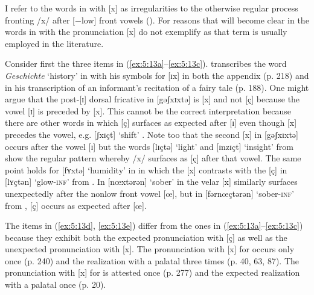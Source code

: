 I refer to the words in  with [x] as irregularities to the otherwise regular process fronting /x/ after [−low] front vowels (). For reasons that will become clear in  the words in  with the pronunciation [x] do not exemplify  as that term is usually employed in the literature.

Consider first the three items in (\ref{ex:5:13a}--\ref{ex:5:13c}). \citet[218]{Martin1925} transcribes the word \textit{Geschichte} ‘history’ in  with his symbols for [ɪx] in both the appendix (p. 218) and in his transcription of an informant’s recitation of a fairy tale (p. 188). One might argue that the post-[ɪ] dorsal fricative in [gəʃxɪxtə] is [x] and not [ç] because the vowel [ɪ] is preceded by [x]. This cannot be the correct interpretation because there are other words in which [ç] surfaces as expected after [ɪ] even though [x] precedes the vowel, e.g. [ʃxɪçt] ‘shift’ \citep[262]{Martin1925}. Note too that the second [x] in [gəʃxɪxtə] occurs after the vowel [ɪ] but the words [lɪçtə] ‘light’ and [ɪnzɪçt] ‘insight’ from  show the regular pattern whereby /x/ surfaces as [ç] after that vowel. The same point holds for [fʏxtə] ‘humidity’ in  in which the [x] contrasts with the [ç] in [lʏçtən] ‘glow-\textsc{inf}’ from . In [nœxtərən] ‘sober’ in  the velar [x] similarly surfaces unexpectedly after the nonlow front vowel [œ], but in [fərnœçtərən] ‘sober-\textsc{inf}’ from , [ç] occurs as expected after [œ].

The items in (\ref{ex:5:13d}, \ref{ex:5:13e}) differ from the ones in (\ref{ex:5:13a}--\ref{ex:5:13c}) because they exhibit both the expected pronunciation with [ç] as well as the unexpected pronunciation with [x]. The pronunciation with [x] for  occurs only once (p. 240) and the realization with a palatal three times (p. 40, 63, 87). The pronunciation with [x] for  is attested once (p. 277) and the expected realization with a palatal once (p. 20).

